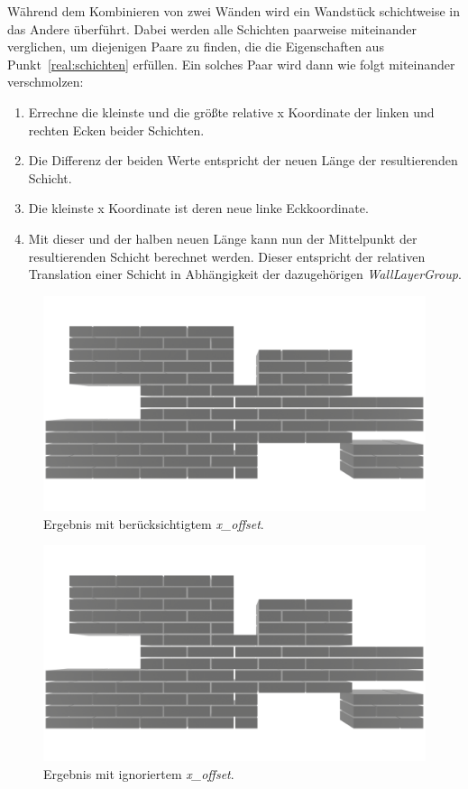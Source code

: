 Während dem Kombinieren von zwei Wänden wird ein Wandstück schichtweise in das Andere überführt.
Dabei werden alle Schichten paarweise miteinander verglichen, um diejenigen Paare zu finden, die die Eigenschaften aus Punkt~\ref{real:schichten} erfüllen.
Ein solches Paar wird dann wie folgt miteinander verschmolzen:
\begin{enumerate}
  \item Errechne die kleinste und die größte relative x Koordinate der linken und rechten Ecken beider Schichten.
  \item Die Differenz der beiden Werte entspricht der neuen Länge der resultierenden Schicht.
  \item Die kleinste x Koordinate ist deren neue linke Eckkoordinate.
  \item Mit dieser und der halben neuen Länge kann nun der Mittelpunkt der resultierenden Schicht berechnet werden. Dieser entspricht der relativen Translation einer Schicht in Abhängigkeit der dazugehörigen \textit{WallLayerGroup}.
\end{enumerate}

\begin{figure}[htb]
  \centering
  \includegraphics[width=0.8\columnwidth]{fig/Real_Combination_Output.png}
  \caption{Ergebnis mit berücksichtigtem \textit{x\_offset}.}\label{fig:real:combination_example_solution_xoffset}
\end{figure}

\begin{figure}[hbt]
  \centering
  \includegraphics[width=0.8\columnwidth]{fig/Real_Combination_Output_No_XOffsetpng.png}
  \caption{Ergebnis mit ignoriertem \textit{x\_offset}.}\label{fig:real:combination_example_solution_no_xoffset}
\end{figure}

